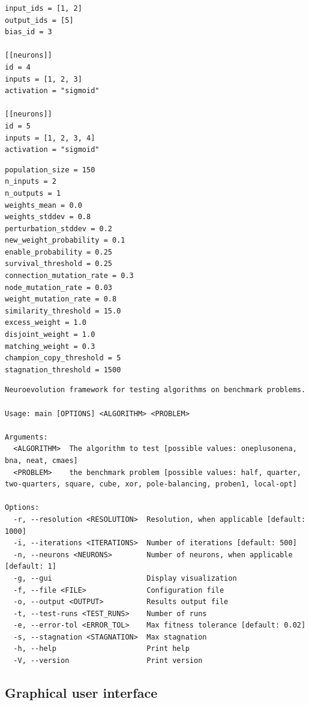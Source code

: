 \begin{lstlisting}[label=verb:cmaes_config,caption=Example of a configuration file for CMAE-ES,float,frame=tb]
input_ids = [1, 2]
output_ids = [5]
bias_id = 3

[[neurons]]
id = 4
inputs = [1, 2, 3]
activation = "sigmoid"

[[neurons]]
id = 5
inputs = [1, 2, 3, 4]
activation = "sigmoid"
\end{lstlisting}

\begin{lstlisting}[label=verb:neat_config,caption=Example of a configuration file for NEAT,float,frame=tb]
population_size = 150
n_inputs = 2
n_outputs = 1
weights_mean = 0.0
weights_stddev = 0.8
perturbation_stddev = 0.2
new_weight_probability = 0.1
enable_probability = 0.25
survival_threshold = 0.25
connection_mutation_rate = 0.3
node_mutation_rate = 0.03
weight_mutation_rate = 0.8
similarity_threshold = 15.0
excess_weight = 1.0
disjoint_weight = 1.0
matching_weight = 0.3
champion_copy_threshold = 5
stagnation_threshold = 1500
\end{lstlisting}

\begin{lstlisting}[label=verb:cli,caption=Command line interface,float,frame=tb]
Neuroevolution framework for testing algorithms on benchmark problems.

Usage: main [OPTIONS] <ALGORITHM> <PROBLEM>

Arguments:
  <ALGORITHM>  The algorithm to test [possible values: oneplusonena, bna, neat, cmaes]
  <PROBLEM>    the benchmark problem [possible values: half, quarter, two-quarters, square, cube, xor, pole-balancing, proben1, local-opt]

Options:
  -r, --resolution <RESOLUTION>  Resolution, when applicable [default: 1000]
  -i, --iterations <ITERATIONS>  Number of iterations [default: 500]
  -n, --neurons <NEURONS>        Number of neurons, when applicable [default: 1]
  -g, --gui                      Display visualization
  -f, --file <FILE>              Configuration file
  -o, --output <OUTPUT>          Results output file
  -t, --test-runs <TEST_RUNS>    Number of runs
  -e, --error-tol <ERROR_TOL>    Max fitness tolerance [default: 0.02]
  -s, --stagnation <STAGNATION>  Max stagnation
  -h, --help                     Print help
  -V, --version                  Print version
\end{lstlisting}

\subsection{Graphical user interface}

